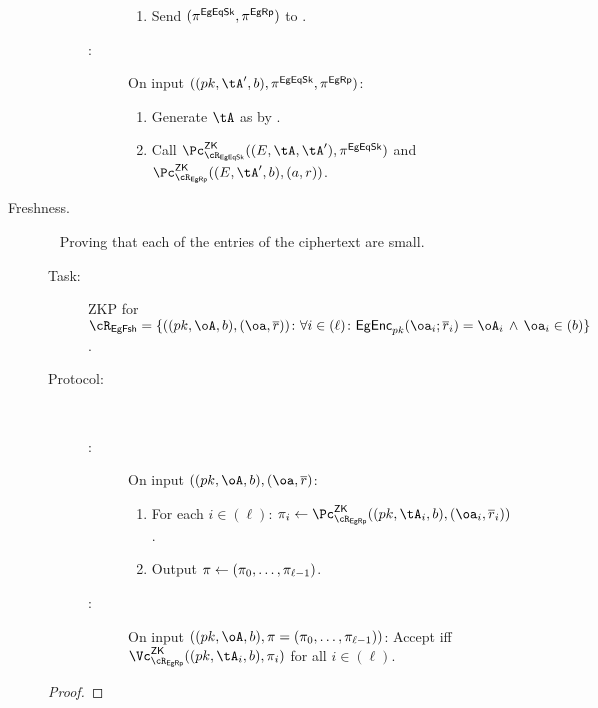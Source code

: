 \begin{description}
\begin{description}
\begin{description}
\begin{enumerate}
			\item Send $(\pi^{{\sf EgEqSk}},\pi^{{\sf EgRp}})$ to \Vc.
		\end{enumerate}
		
		
		\item[\Vc:] On input $((\pk,\tA',b),\pi^\EgEqSkS,\pi^\EgRps)$:
		
		\begin{enumerate}
			\item   Generate $\tA$ as by \Pc.
			\item  Call $\pZK{\rEgEqSk}((E,\tA,\tA'
			), \pi^\EgEqSkS)$ and  $\pZK{\rEgRp}((E,\tA',b), (a,r))$.
			
		\end{enumerate}
		
	\end{description}

	
\end{description}
	
\item[Freshness.]  ~
Proving that each of the entries of the  ciphertext are small. 

\begin{description}
	\item[Task:] ZKP for $\rtFsh =\rtFshDef$.

\item[Protocol:]~

\begin{description}	
	\item[\Pc:] On  input  $((\pk,\oA,b),(\oa,\orr)$:
	
	\begin{enumerate}
		\item For each $i\in (\ell)$: $\pi_i \asn \pZK{\rEgRp}((\pk,\tA_i,b), (\oa_i,\orr_i))$.
		\item Output $\pi \leftarrow (\pi_0,\ldots, \pi_{\ell-1})$.
	\end{enumerate}
	 
	 
	 	\item[\Vc:] On  input  $((\pk,\oA,b), \pi= (\pi_0,\ldots, \pi_{\ell-1}))$: Accept iff  $\vZK{\rEgRp}((\pk,\tA_i,b), \pi_i)$ for all $i\in (\ell)$.
	 
	 
\end{description}

\end{description}

\begin{proof}
\end{proof}
\end{description}


